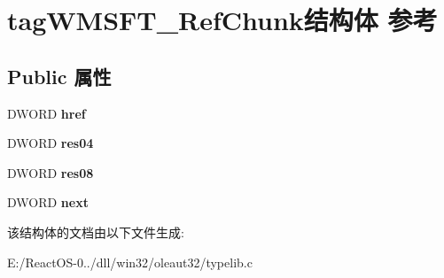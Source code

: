 \hypertarget{structtag_w_m_s_f_t___ref_chunk}{}\section{tag\+W\+M\+S\+F\+T\+\_\+\+Ref\+Chunk结构体 参考}
\label{structtag_w_m_s_f_t___ref_chunk}
\subsection*{Public 属性}
\begin{DoxyCompactItemize}
\item 
\mbox{\label{structtag_w_m_s_f_t___ref_chunk_a50225f486643b528d330bda5a3de112f}} 
D\+W\+O\+RD {\bfseries href}
\item 
\mbox{\label{structtag_w_m_s_f_t___ref_chunk_a4323c0789e98a56fd9a97ddcccfb7f21}} 
D\+W\+O\+RD {\bfseries res04}
\item 
\mbox{\label{structtag_w_m_s_f_t___ref_chunk_aa9a708cc3904572a99f849f35e184a68}} 
D\+W\+O\+RD {\bfseries res08}
\item 
\mbox{\label{structtag_w_m_s_f_t___ref_chunk_ac0562a33a0b1b42a548c8359ce8f5952}} 
D\+W\+O\+RD {\bfseries next}
\end{DoxyCompactItemize}


该结构体的文档由以下文件生成\+:\begin{DoxyCompactItemize}
\item 
E\+:/\+React\+O\+S-\/0../dll/win32/oleaut32/typelib.\+c\end{DoxyCompactItemize}
